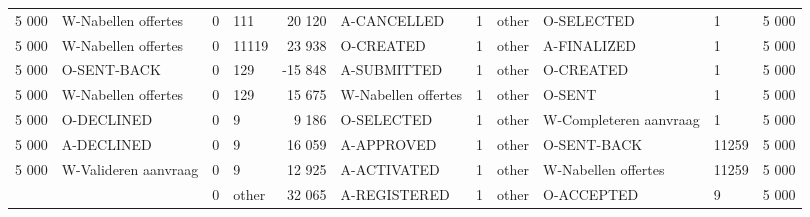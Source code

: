 \begin{tabular}{llllrlllllr}
5 000 & W-Nabellen offertes & 0 & 111 & 20 120 & A-CANCELLED & 1 & other & O-SELECTED & 1 & 5 000 \\
5 000 & W-Nabellen offertes & 0 & 11119 & 23 938 & O-CREATED & 1 & other & A-FINALIZED & 1 & 5 000 \\
5 000 & O-SENT-BACK & 0 & 129 & -15 848 & A-SUBMITTED & 1 & other & O-CREATED & 1 & 5 000 \\
5 000 & W-Nabellen offertes & 0 & 129 & 15 675 & W-Nabellen offertes & 1 & other & O-SENT & 1 & 5 000 \\
5 000 & O-DECLINED & 0 & 9 & 9 186 & O-SELECTED & 1 & other & W-Completeren aanvraag & 1 & 5 000 \\
5 000 & A-DECLINED & 0 & 9 & 16 059 & A-APPROVED & 1 & other & O-SENT-BACK & 11259 & 5 000 \\
5 000 & W-Valideren aanvraag & 0 & 9 & 12 925 & A-ACTIVATED & 1 & other & W-Nabellen offertes & 11259 & 5 000 \\
 &  & 0 & other & 32 065 & A-REGISTERED & 1 & other & O-ACCEPTED & 9 & 5 000 \\
\bottomrule
\end{tabular}
